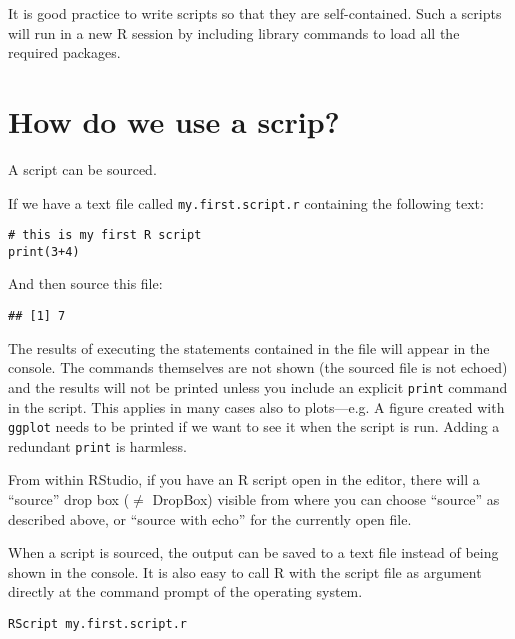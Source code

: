 \documentclass[paper=a4,headsepline,BCOR=12mm,twoside,open=right,%
titlepage,headings=small,fontsize=10pt,index=totoc,bibliography=totoc,%
captions=tableheading,captions=nooneline]{scrbook}\usepackage{knitr}
\begin{document}
It is good practice to write scripts so that they are self-contained. Such a scripts will run in a new R session by including library commands to load all the required packages.



\section{How do we use a scrip?}

A script can be sourced.

If we have a text file called \texttt{my.first.script.r} containing the following text:
\begin{verbatim}
# this is my first R script
print(3+4)
\end{verbatim}

And then source this file:

\begin{knitrout}\footnotesize
{}\color{fgcolor}\begin{kframe}
\begin{alltt}
\hlstd{(}\hlstd{)}
\end{alltt}
\begin{verbatim}
## [1] 7
\end{verbatim}
\end{kframe}
\end{knitrout}

The results of executing the statements contained in the file will appear in the console. The commands themselves are not shown (the sourced file is not echoed) and the results will not be printed unless you include an explicit \texttt{print} command in the script. This applies in many cases also to plots---e.g. A figure created with \texttt{ggplot} needs to be printed if we want to see it when the script is run. Adding a redundant \texttt{print} is harmless.

From within RStudio, if you have an R script open in the editor, there will a ``source'' drop box ($\neq$ DropBox) visible from where you can choose ``source'' as described above, or ``source with echo'' for the currently open file.

When a script is sourced, the output can be saved to a text file instead of being shown in the console. It is also easy to call R with the script file as argument directly at the command prompt of the operating system.

\begin{verbatim}
RScript my.first.script.r
\end{verbatim}
\end{document}
